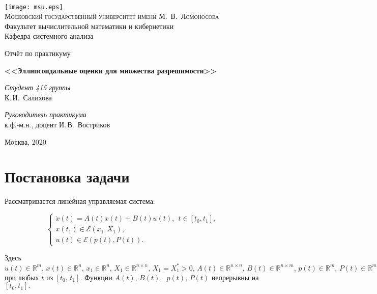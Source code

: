 \documentclass[16pt]{article}
\newcommand\Real{\mathbb{R}}
\begin{document}
\thispagestyle{empty}

\begin{center}
\ \vspace{-3cm}

\texttt{[image: msu.eps]}\\
{\scshape Московский государственный университет имени М.~В.~Ломоносова}\\
Факультет вычислительной математики и кибернетики\\
Кафедра системного анализа

\vfill

{\LARGE Отчёт по практикуму}

\vspace{1cm}

{\Huge\bfseries <<Эллипсоидальные оценки для множества разрешимости>>}
\end{center}

\vspace{1cm}

\begin{flushright}
  \large
  \textit{Студент 415 группы}\\
  К.\,И.~Салихова

  \vspace{5mm}

  \textit{Руководитель практикума}\\
  к.ф.-м.н., доцент И.\,В.~Востриков
\end{flushright}

\vfill

\begin{center}
Москва, 2020
\end{center}

\newpage
\tableofcontents
\newpage
\section{Постановка задачи}
Рассматривается линейная управляемая система:

\begin{equation}\label{task}
\begin{cases}
\dot{x}(t)  = A(t)x(t) + B(t)u(t), \ \ t \in [t_0, t_1],\\
x(t_1) \in \mathcal{E}(x_1, X_1),\\
u(t)\in \mathcal{E}(p(t), P(t)).
\end{cases}
\end{equation}


Здесь $u(t) \in \Real^m, \, x(t) \in \Real^n,\, x_1 \in \Real^n, \,X_1 \in \Real^{n \times n},\, X_1 = X_1^* > 0, \, A(t) \in \Real^{n \times n}, \,B(t) \in \Real^{n \times m},\, p(t) \in \Real^m, \, P(t) \in \Real^{m \times m},\, P(t) = P^*(t) > 0 $ при любых $t$ из $[t_0,\, t_1]$. Функции $A(t),\, B(t),\,$ $p(t),\, P(t)$ непрерывны на $[t_0, t_1].$
\end{document}
